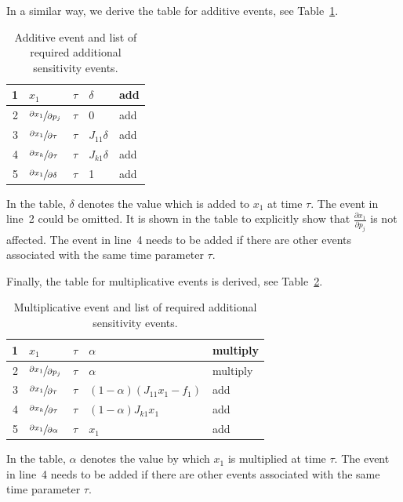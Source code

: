 \documentclass[journal, a4paper]{IEEEtran}
\begin{document}
In a similar way, we derive the table for additive events, see Table~\ref{tab:additive}.
\begin{table}[ht]
\caption{Additive event and list of required additional sensitivity events.}
\label{tab:additive}
\begin{center}
\begin{tabular}{|r|l|l|l|l|}\hline
     1 & $x_1$ & $\tau$ & $\delta$ & add \\
     \hline
     2 & $\sfrac{\partial x_1}{\partial p_j}$ & $\tau$ & $0$ & add \\
     3 & $\sfrac{\partial x_1}{\partial \tau}$ & $\tau$ & $J_{11}\delta$ & add \\
     4 & $\sfrac{\partial x_k}{\partial \tau}$ & $\tau$ & $J_{k1}\delta$ & add \\
     5 &$\sfrac{\partial x_1}{\partial \delta}$ & $\tau$ & 1 & add \\
     \hline
\end{tabular}
\end{center}
\end{table}
In the table, $\delta$ denotes the value which is added to $x_1$ at time $\tau$. The event in line~2 could be omitted. It is shown in the table to explicitly show that $\frac{\partial x_1}{\partial p_j}$ is not affected. The event in line~4 needs to be added if there are other events associated with the same time parameter $\tau$.

Finally, the table for multiplicative events is derived, see Table~\ref{tab:multi}.
\begin{table}[ht]
\caption{Multiplicative event and list of required additional sensitivity events.}
\label{tab:multi}
\begin{center}
\begin{tabular}{|r|l|l|l|l|}\hline
     1 & $x_1$ & $\tau$ & $\alpha$ & multiply \\
     \hline
     2 & $\sfrac{\partial x_1}{\partial p_j}$ & $\tau$ & $\alpha$ & multiply \\
     3 & $\sfrac{\partial x_1}{\partial \tau}$ & $\tau$ & $(1-\alpha)(J_{11}x_1-f_1)$ & add \\
     4 & $\sfrac{\partial x_k}{\partial \tau}$ & $\tau$ & $(1-\alpha)J_{k1}x_1$ & add \\
     5 &$\sfrac{\partial x_1}{\partial \alpha}$ & $\tau$ & $x_1$ & add \\
     \hline
\end{tabular}
\end{center}
\end{table}
In the table, $\alpha$ denotes the value by which $x_1$ is multiplied at time $\tau$. The event in line~4 needs to be added if there are other events associated with the same time parameter $\tau$.
\end{document}

